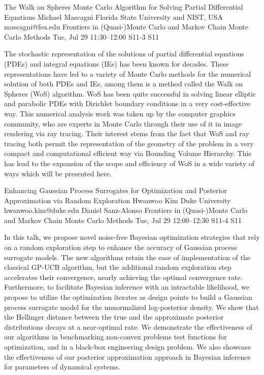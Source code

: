 \begin{talk}
  {The Walk on Spheres Monte Carlo Algorithm for Solving Partial Differential Equations}%
  {Michael Mascagni}%
  {Florida State University and NIST, USA}%
  {mascagni@fsu.edu}%
  {Frontiers in (Quasi-)Monte Carlo and Markov Chain Monte Carlo Methods}%
  {}%
  {Tue, Jul 29 11:30--12:00}%
  {S11-3}%
  {S11}%
    
   
The stochastic representation of the solutions of partial differential equations (PDEs) and integral equations (IEs) has been known for decades.  These representations have led to a variety of Monte Carlo methods for the numerical solution of both PDEs and IEs, among them is a method called the Walk on Spheres (WoS) algorithm.  WoS has been quite successful in solving linear elliptic and parabolic PDEs with Dirichlet boundary conditions in a very cost-effective way.  This numerical analysis work was taken up by the computer graphics community, who are experts in Monte Carlo through their use of it in image rendering via ray tracing.  Their interest stems from the fact that WoS and ray tracing both permit the representation of the geometry of the problem in a very compact and computational efficient way via Bounding Volume Hierarchy.  This has lead to the expansion of the scope and efficiency of WoS in a wide variety of ways which will be presented here.
\end{talk}

\begin{talk}
  {Enhancing Gaussian Process Surrogates for Optimization and Posterior Approximation via Random Exploration}%
  {Hwanwoo Kim}%
  {Duke University}%
  {hwanwoo.kim@duke.edu}%
  {Daniel Sanz-Alonso}%
  {Frontiers in (Quasi-)Monte Carlo and Markov Chain Monte Carlo Methods}%
  {Tue, Jul 29 12:00--12:30}%
  {S11-4}%
  {S11}%
    
   
In this talk, we propose novel noise-free Bayesian optimization strategies that rely on a random exploration step to enhance the accuracy of Gaussian process surrogate models. The new algorithms retain the ease of implementation of the classical GP-UCB algorithm, but the additional random exploration step accelerates their convergence, nearly achieving the optimal convergence rate. Furthermore, to facilitate Bayesian inference with an intractable likelihood, we propose to utilize the optimization iterates as design points to build a Gaussian process surrogate model for the unnormalized log-posterior density. We show that the Hellinger distance between the true and the approximate posterior distributions decays at a near-optimal rate. We demonstrate the effectiveness of our algorithms in benchmarking non-convex problems test functions for optimization, and in a black-box engineering design problem. We also showcase the effectiveness of our posterior approximation approach in Bayesian inference for parameters of dynamical systems.


\end{talk}

